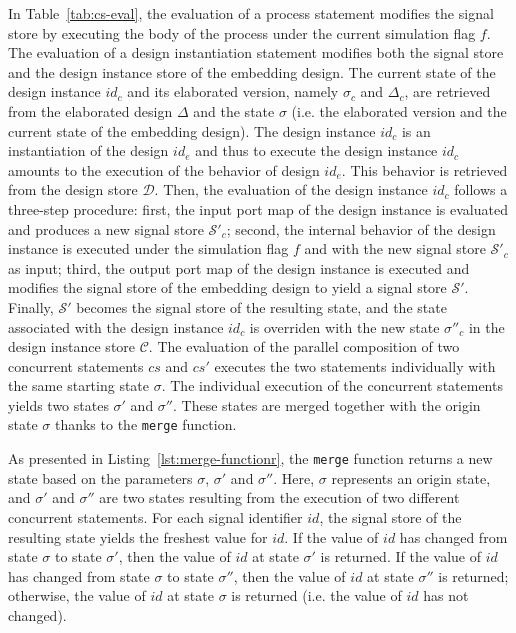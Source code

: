 \documentclass[pdflatex,sn-mathphys]{sn-jnl}%
\theoremstyle{thmstyleone}%
\theoremstyle{thmstyletwo}%
\theoremstyle{thmstylethree}%
\begin{document}
In Table~\ref{tab:cs-eval}, the evaluation of a process statement
modifies the signal store by executing the body of the process under
the current simulation flag $f$. The evaluation of a design
instantiation statement modifies both the signal store and the design
instance store of the embedding design. The current state of the
design instance $id_c$ and its elaborated version, namely $\sigma_c$
and $\Delta_c$, are retrieved from the elaborated design $\Delta$ and
the state $\sigma$ (i.e. the elaborated version and the current state
of the embedding design). The design instance $id_c$ is an
instantiation of the design $id_e$ and thus to execute the design
instance $id_c$ amounts to the execution of the behavior of design
$id_e$. This behavior is retrieved from the design store
$\mathcal{D}$. Then, the evaluation of the design instance $id_c$
follows a three-step procedure: first, the input port map of the
design instance is evaluated and produces a new signal store
$\mathcal{S}'_c$; second, the internal behavior of the design instance
is executed under the simulation flag $f$ and with the new signal
store $\mathcal{S}'_c$ %
as input; third, the output port map of the design instance is
executed and modifies the signal store of the embedding design to
yield a signal store $\mathcal{S}'$. Finally, $\mathcal{S}'$ becomes
the signal store of the resulting state, and the state associated with
the design instance $id_c$ is overriden with the new state
$\sigma''_c$ in the design instance store $\mathcal{C}$.  The
evaluation of the parallel composition of two concurrent statements
$cs$ and $cs'$ executes the two statements individually with the same
starting state $\sigma$. The individual execution of the concurrent
statements yields two states $\sigma'$ and $\sigma''$. These states
are merged together with the origin state $\sigma$ thanks to the
\texttt{merge} function.

As presented in Listing~\ref{lst:merge-functionr}, the \texttt{merge}
function returns a new state based on the parameters $\sigma$,
$\sigma'$ and $\sigma''$. Here, $\sigma$ represents an origin state,
and $\sigma'$ and $\sigma''$ are two states resulting from the
execution of two different concurrent statements. For each signal
identifier $id$, the signal store of the resulting state yields the
freshest value for $id$. If the value of $id$ has changed from state
$\sigma$ to state $\sigma'$, then the value of $id$ at state $\sigma'$
is returned. If the value of $id$ has changed from state $\sigma$ to
state $\sigma''$, then the value of $id$ at state $\sigma''$ is
returned; otherwise, the value of $id$ at state $\sigma$ is returned
(i.e. the value of $id$ has not changed).
\end{document}
